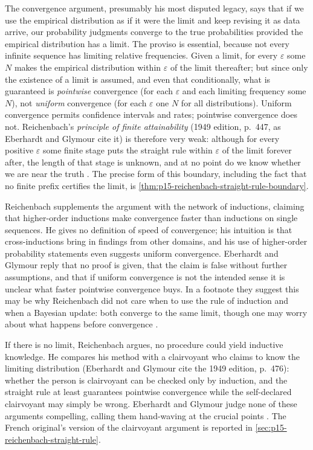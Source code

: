 The convergence argument, presumably his most disputed legacy, says that
if we use the empirical distribution as if it were the limit and keep
revising it as data arrive, our probability judgments converge to the
true probabilities provided the empirical distribution has a limit. The
proviso is essential, because not every infinite sequence has limiting
relative frequencies. Given a limit, for every \(\varepsilon\) some \(N\)
makes the empirical distribution within \(\varepsilon\) of the limit
thereafter; but since only the existence of a limit is assumed, and even
that conditionally, what is guaranteed is \emph{pointwise} convergence
(for each \(\varepsilon\) and each limiting frequency some \(N\)), not
\emph{uniform} convergence (for each \(\varepsilon\) one \(N\) for all
distributions). Uniform convergence permits confidence intervals and
rates; pointwise convergence does not. Reichenbach's \emph{principle of
finite attainability} (1949 edition, p.~447, as Eberhardt and Glymour cite it) is
therefore very weak: although for every positive \(\varepsilon\) some
finite stage puts the straight rule within \(\varepsilon\) of the limit
forever after, the length of that stage is unknown, and at no point do
we know whether we are near the truth
\cite[p.~375]{EberhardtGlymour2011ReichenbachReading}. The precise form
of this boundary, including the fact that no finite prefix certifies the
limit, is \cref{thm:p15-reichenbach-straight-rule-boundary}.

Reichenbach supplements the argument with the network of inductions,
claiming that higher-order inductions make convergence faster than
inductions on single sequences. He gives no definition of speed of
convergence; his intuition is that cross-inductions bring in findings
from other domains, and his use of higher-order probability statements
even suggests uniform convergence. Eberhardt and Glymour reply that no proof is
given, that the claim is false without further assumptions, and that if
uniform convergence is not the intended sense it is unclear what faster
pointwise convergence buys. In a footnote they suggest this may be why
Reichenbach did not care when to use the rule of induction and when a
Bayesian update: both converge to the same limit, though one may worry
about what happens before convergence
\cite[p.~375 and n.~12]{EberhardtGlymour2011ReichenbachReading}.

If there is no limit, Reichenbach argues, no procedure could yield
inductive knowledge. He compares his method with a clairvoyant who
claims to know the limiting distribution (Eberhardt and Glymour cite the 1949
edition, p.~476): whether the person is clairvoyant can be checked only
by induction, and the straight rule at least guarantees pointwise
convergence while the self-declared clairvoyant may simply be wrong. Eberhardt and Glymour judge none of these arguments compelling, calling them
hand-waving at the crucial points \cite[p.~376]{EberhardtGlymour2011ReichenbachReading}.
The French original's version of the clairvoyant argument is reported in
\cref{sec:p15-reichenbach-straight-rule}.

